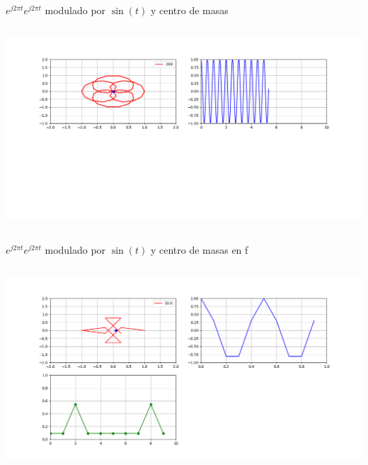 \begin{frame}{$e^{j2\pi t}$}{$e^{j2\pi t}$ modulado por $\sin(t)$ y centro de masas }
   \handsonicon
   \begin{columns}[onlytextwidth]
      
      \centering\includegraphics[width=1.0\textwidth]{2_clase/euler3}
   \end{columns}
   \vfill
\end{frame}
\begin{frame}{$e^{j2\pi t}$}{$e^{j2\pi t}$ modulado por $\sin(t)$ y centro de masas en f}
   \handsonicon
   \begin{columns}[onlytextwidth]
      
      \centering\includegraphics[width=1.0\textwidth]{2_clase/euler4}
   \end{columns}
   \vfill
\end{frame}

